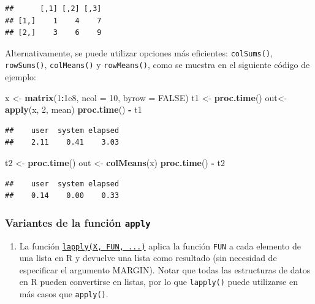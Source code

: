 \documentclass[
]{book}
\newenvironment{Shaded}{\begin{snugshade}}{\end{snugshade}}
\newcommand{\AttributeTok}[1]{\textcolor[rgb]{0.13,0.29,0.53}{#1}}
\newcommand{\ConstantTok}[1]{\textcolor[rgb]{0.56,0.35,0.01}{#1}}
\newcommand{\DecValTok}[1]{\textcolor[rgb]{0.00,0.00,0.81}{#1}}
\newcommand{\FloatTok}[1]{\textcolor[rgb]{0.00,0.00,0.81}{#1}}
\newcommand{\FunctionTok}[1]{\textcolor[rgb]{0.13,0.29,0.53}{\textbf{#1}}}
\newcommand{\NormalTok}[1]{#1}
\newcommand{\OtherTok}[1]{\textcolor[rgb]{0.56,0.35,0.01}{#1}}
\newcommand{\SpecialCharTok}[1]{\textcolor[rgb]{0.81,0.36,0.00}{\textbf{#1}}}
\providecommand{\tightlist}{%
  \setlength{\itemsep}{0pt}\setlength{\parskip}{0pt}}
\theoremstyle{break}
\theoremstyle{nonumberplain}
\begin{document}
\begin{verbatim}
##      [,1] [,2] [,3]
## [1,]    1    4    7
## [2,]    3    6    9
\end{verbatim}

Alternativamente, se puede utilizar opciones más eficientes: \texttt{colSums()}, \texttt{rowSums()}, \texttt{colMeans()} y \texttt{rowMeans()}, como se muestra en el siguiente código de ejemplo:

\begin{Shaded}
\begin{Highlighting}[]
\NormalTok{x }\OtherTok{\textless{}{-}} \FunctionTok{matrix}\NormalTok{(}\DecValTok{1}\SpecialCharTok{:}\FloatTok{1e8}\NormalTok{, }\AttributeTok{ncol =} \DecValTok{10}\NormalTok{, }\AttributeTok{byrow =} \ConstantTok{FALSE}\NormalTok{)}
\NormalTok{t1 }\OtherTok{\textless{}{-}} \FunctionTok{proc.time}\NormalTok{()}
\NormalTok{out}\OtherTok{\textless{}{-}}\FunctionTok{apply}\NormalTok{(x, }\DecValTok{2}\NormalTok{, mean)   }
\FunctionTok{proc.time}\NormalTok{() }\SpecialCharTok{{-}}\NormalTok{ t1}
\end{Highlighting}
\end{Shaded}

\begin{verbatim}
##    user  system elapsed 
##    2.11    0.41    3.03
\end{verbatim}

\begin{Shaded}
\begin{Highlighting}[]
\NormalTok{t2 }\OtherTok{\textless{}{-}} \FunctionTok{proc.time}\NormalTok{()}
\NormalTok{out }\OtherTok{\textless{}{-}} \FunctionTok{colMeans}\NormalTok{(x)}
\FunctionTok{proc.time}\NormalTok{() }\SpecialCharTok{{-}}\NormalTok{ t2}
\end{Highlighting}
\end{Shaded}

\begin{verbatim}
##    user  system elapsed 
##    0.14    0.00    0.33
\end{verbatim}

\subsubsection{\texorpdfstring{Variantes de la función \texttt{apply}}{Variantes de la función apply}}\label{variantes-de-la-funciuxf3n-apply}

\begin{enumerate}
\def\labelenumi{\alph{enumi}.}
\tightlist
\item
  La función \href{https://www.rdocumentation.org/packages/base/versions/3.6.1/topics/lapply}{\texttt{lapply(X,\ FUN,\ ...)}}
  aplica la función \texttt{FUN} a cada elemento de una lista en R y devuelve una lista como resultado (sin necesidad de especificar el argumento MARGIN). Notar que todas las estructuras de datos en R pueden convertirse en listas, por lo que \texttt{lapply()} puede utilizarse en más casos que \texttt{apply()}.
\end{enumerate}
\end{document}
